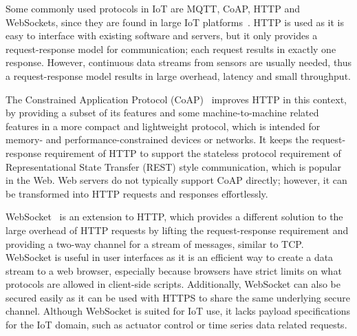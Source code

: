 Some commonly used protocols in IoT are MQTT, CoAP, HTTP and WebSockets, since they are found in large IoT platforms~\cite{A_Survey_of_IoT_Platform_Comparison_for_Building_Cyber-Physical_System_Architecture}. HTTP is used as it is easy to interface with existing software and servers, but it only provides a request-response model for communication; each request results in exactly one response. However, continuous data streams from sensors are usually needed, thus a request-response model results in large overhead, latency and small throughput.

The Constrained Application Protocol (CoAP)~\cite{The_Constrained_Application_Protocol_RFC7252} improves HTTP in this context, by providing a subset of its features and some machine-to-machine related features in a more compact and lightweight protocol, which is intended for memory- and performance-constrained devices or networks. It keeps the request-response requirement of HTTP to support the stateless protocol requirement of Representational State Transfer (REST) style communication, which is popular in the Web. Web servers do not typically support CoAP directly; however, it can be transformed into HTTP requests and responses effortlessly.

 WebSocket~\cite{WebSocket_RFC6455} is an extension to HTTP, which provides a different solution to the large overhead of HTTP requests by lifting the request-response requirement and providing a two-way channel for a stream of messages, similar to TCP. WebSocket is useful in user interfaces as it is an efficient way to create a data stream to a web browser, especially because browsers have strict limits on what protocols are allowed in client-side scripts. Additionally, WebSocket can also be secured easily as it can be used with HTTPS to share the same underlying secure channel. Although WebSocket is suited for IoT use, it lacks payload specifications for the IoT domain, such as actuator control or time series data related requests.


